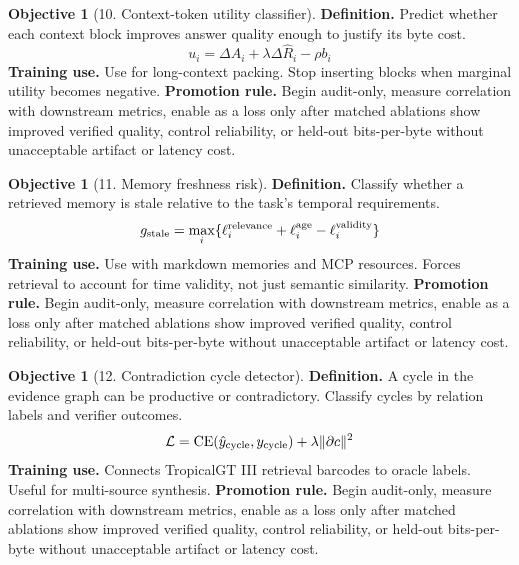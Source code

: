 \documentclass[11pt]{article}
\theoremstyle{definition}
\newtheorem{objective}[theorem]{Objective}
\theoremstyle{remark}
\newcommand{\CE}{\operatorname{CE}}
\newcommand{\loss}{\mathcal{L}}
\numberwithin{equation}{section}
\begin{document}
\begin{objective}[10. Context-token utility classifier]
\textbf{Definition.} Predict whether each context block improves answer quality enough to justify its byte cost.
\begin{equation}
    u_i=\Delta \hat A_i+\lambda\Delta \hat R_i-\rho b_i
\end{equation}
\textbf{Training use.} Use for long-context packing. Stop inserting blocks when marginal utility becomes negative.
\textbf{Promotion rule.} Begin audit-only, measure correlation with downstream metrics, enable as a loss only after matched ablations show improved verified quality, control reliability, or held-out bits-per-byte without unacceptable artifact or latency cost.
\end{objective}


\begin{objective}[11. Memory freshness risk]
\textbf{Definition.} Classify whether a retrieved memory is stale relative to the task's temporal requirements.
\begin{equation}
    g_{\rm stale}=\max_i\{\ell_i^{\rm relevance}+\ell_i^{\rm age}-\ell_i^{\rm validity}\}
\end{equation}
\textbf{Training use.} Use with markdown memories and MCP resources. Forces retrieval to account for time validity, not just semantic similarity.
\textbf{Promotion rule.} Begin audit-only, measure correlation with downstream metrics, enable as a loss only after matched ablations show improved verified quality, control reliability, or held-out bits-per-byte without unacceptable artifact or latency cost.
\end{objective}


\begin{objective}[12. Contradiction cycle detector]
\textbf{Definition.} A cycle in the evidence graph can be productive or contradictory. Classify cycles by relation labels and verifier outcomes.
\begin{equation}
    \loss=\CE(\hat y_{\rm cycle},y_{\rm cycle})+\lambda\|\partial c\|^2
\end{equation}
\textbf{Training use.} Connects TropicalGT III retrieval barcodes to oracle labels. Useful for multi-source synthesis.
\textbf{Promotion rule.} Begin audit-only, measure correlation with downstream metrics, enable as a loss only after matched ablations show improved verified quality, control reliability, or held-out bits-per-byte without unacceptable artifact or latency cost.
\end{objective}
\end{document}
